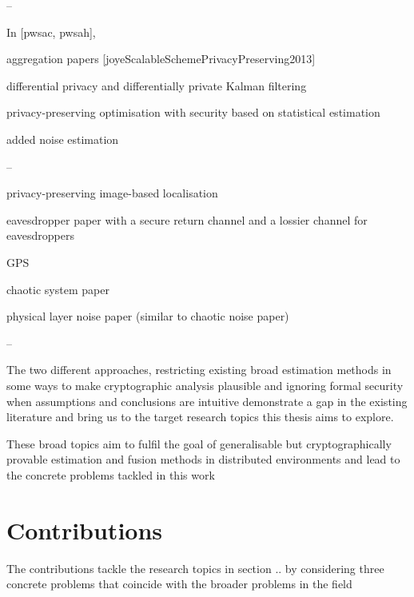 --

In [pwsac, pwsah], 

aggregation papers [joyeScalableSchemePrivacyPreserving2013]

differential privacy and differentially private Kalman filtering

privacy-preserving optimisation with security based on statistical estimation

added noise estimation

--

privacy-preserving image-based localisation

eavesdropper paper with a secure return channel and a lossier channel for eavesdroppers

GPS

chaotic system paper

physical layer noise paper (similar to chaotic noise paper)

--


The two different approaches, restricting existing broad estimation methods in some ways to make cryptographic analysis plausible and ignoring formal security when assumptions and conclusions are intuitive demonstrate a gap in the existing literature and bring us to the target research topics this thesis aims to explore.

These broad topics aim to fulfil the goal of generalisable but cryptographically provable estimation and fusion methods in distributed environments and lead to the concrete problems tackled in this work


% 
%                                                
%                                                
%                                                
% 

\section{Contributions}\label{sec:intro:contributions}

The contributions tackle the research topics in section .. by considering three concrete problems that coincide with the broader problems in the field

